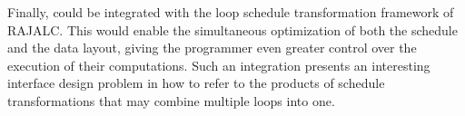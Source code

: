 Finally, \FormatDecisions{} could be integrated with the loop schedule transformation framework of RAJALC. 
This would enable the simultaneous optimization of both the schedule and the data layout, giving the programmer even greater control over the execution of their computations.
Such an integration presents an interesting interface design problem in how to refer to the products of schedule transformations that may combine multiple loops into one. 


